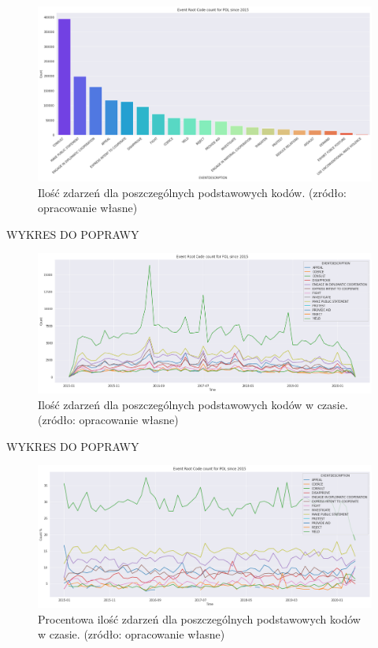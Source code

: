 \documentclass[11pt]{report}
\begin{document}
 	\begin{figure}[ht]
	\centering
	\includegraphics[width=0.8 \textwidth]{fig/PL/PLERC.png}
	\caption{Ilość zdarzeń dla poszczególnych podstawowych kodów. (zródło: opracowanie własne)}
	\label{fig:PLPERC}
	\end{figure}
		   WYKRES DO POPRAWY
 	\begin{figure}[ht]
	\centering
	\includegraphics[width=0.8 \textwidth]{fig/PL/PLERCinTIME.png}
	\caption{Ilość zdarzeń dla poszczególnych podstawowych kodów w czasie. (zródło: opracowanie własne)}
	\label{fig:PLPERCinTIME}
	\end{figure}
 	   WYKRES DO POPRAWY
  	\begin{figure}[ht]
	\centering
	\includegraphics[width=0.8 \textwidth]{fig/PL/PLERCpercinTIME.png}
	\caption{Procentowa ilość zdarzeń dla poszczególnych podstawowych kodów w czasie. (zródło: opracowanie własne)}
	\label{fig:PLPERCpercinTIME}
	\end{figure}
	
\end{document}
